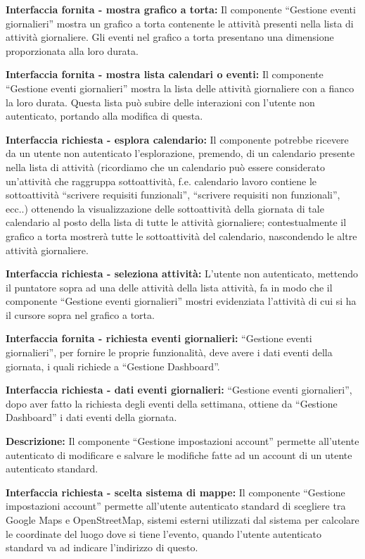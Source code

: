 \begin{listaPersonale}[DCI]{}
    \textbf{Interfaccia fornita - mostra grafico a torta:} Il componente “Gestione eventi giornalieri” mostra un grafico a torta contenente le attività presenti nella lista di attività giornaliere. Gli eventi nel grafico a torta presentano una dimensione proporzionata alla loro durata.

    \textbf{Interfaccia fornita - mostra lista calendari o eventi:} Il componente “Gestione eventi giornalieri” mostra la lista delle attività giornaliere con a fianco la loro durata. Questa lista può subire delle interazioni con l'utente non autenticato, portando alla modifica di questa.

    \textbf{Interfaccia richiesta - esplora calendario:} Il componente potrebbe ricevere da un utente non autenticato l'esplorazione, premendo, di un calendario presente nella lista di attività (ricordiamo che un calendario può essere considerato un'attività che raggruppa sottoattività, f.e. calendario lavoro contiene le sottoattività “scrivere requisiti funzionali”, “scrivere requisiti non funzionali”, ecc..) ottenendo la visualizzazione delle sottoattività della giornata di tale calendario al posto della lista di tutte le attività giornaliere; contestualmente il grafico a torta mostrerà tutte le sottoattività del calendario, nascondendo le altre attività giornaliere.

    \textbf{Interfaccia richiesta - seleziona attività:} L'utente non autenticato, mettendo il puntatore sopra ad una delle attività della lista attività, fa in modo che il componente “Gestione eventi giornalieri” mostri evidenziata l'attività di cui si ha il cursore sopra nel grafico a torta.

    \textbf{Interfaccia fornita - richiesta eventi giornalieri:} “Gestione eventi giornalieri”, per fornire le proprie funzionalità, deve avere i dati eventi della giornata, i quali richiede a “Gestione Dashboard”.

    \textbf{Interfaccia richiesta - dati eventi giornalieri:} “Gestione eventi giornalieri”, dopo aver fatto la richiesta degli eventi della settimana, ottiene da “Gestione Dashboard” i dati eventi della giornata.



    \textbf{Descrizione:} Il componente “Gestione impostazioni account” permette all'utente autenticato di modificare e salvare le modifiche fatte ad un account di un utente autenticato standard.

    \textbf{Interfaccia richiesta - scelta sistema di mappe:} Il componente “Gestione impostazioni account” permette all'utente autenticato standard di scegliere tra Google Maps e OpenStreetMap, sistemi esterni utilizzati dal sistema per calcolare le coordinate del luogo dove si tiene l'evento, quando l'utente autenticato standard va ad indicare l'indirizzo di questo.


\end{listaPersonale}

